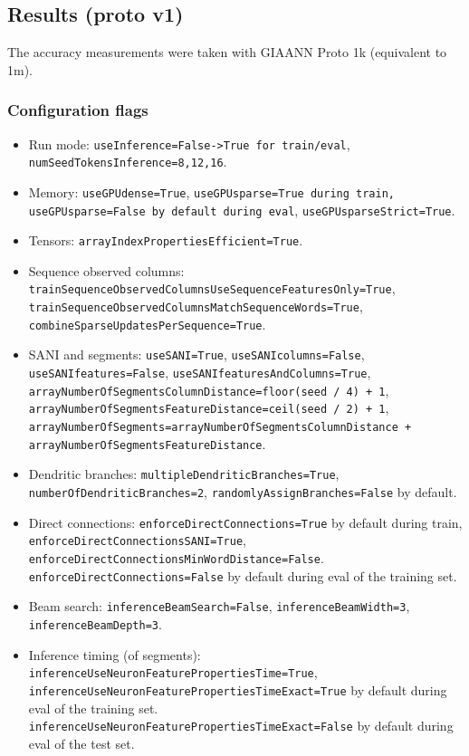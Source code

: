 

\subsection{Results (proto v1)}

The accuracy measurements were taken with GIAANN Proto 1k (equivalent to 1m).

\subsubsection{Configuration flags}

\begin{itemize}
	\item Run mode: \texttt{useInference=False->True for train/eval}, \texttt{numSeedTokensInference=8,12,16}.
	\item Memory: \texttt{useGPUdense=True}, \texttt{useGPUsparse=True during train, useGPUsparse=False by default during eval}, \texttt{useGPUsparseStrict=True}.
	\item Tensors: \texttt{arrayIndexPropertiesEfficient=True}.
	\item Sequence observed columns: \texttt{trainSequenceObservedColumnsUseSequenceFeaturesOnly=True}, \texttt{trainSequenceObservedColumnsMatchSequenceWords=True}, \texttt{combineSparseUpdatesPerSequence=True}.
	\item SANI and segments: \texttt{useSANI=True}, \texttt{useSANIcolumns=False}, \texttt{useSANIfeatures=False}, \texttt{useSANIfeaturesAndColumns=True}, \texttt{arrayNumberOfSegmentsColumnDistance=floor(seed / 4) + 1}, \texttt{arrayNumberOfSegmentsFeatureDistance=ceil(seed / 2) + 1}, \texttt{arrayNumberOfSegments=arrayNumberOfSegmentsColumnDistance + arrayNumberOfSegmentsFeatureDistance}.
	\item Dendritic branches: \texttt{multipleDendriticBranches=True}, \texttt{numberOfDendriticBranches=2}, \texttt{randomlyAssignBranches=False} by default.
	\item Direct connections: \texttt{enforceDirectConnections=True} by default during train, \texttt{enforceDirectConnectionsSANI=True}, \texttt{enforceDirectConnectionsMinWordDistance=False}. \texttt{enforceDirectConnections=False} by default during eval of the training set.
	\item Beam search: \texttt{inferenceBeamSearch=False}, \texttt{inferenceBeamWidth=3}, \texttt {inferenceBeamDepth=3}.
	\item Inference timing (of segments): \texttt{inferenceUseNeuronFeaturePropertiesTime=True}, \texttt{inferenceUseNeuronFeaturePropertiesTimeExact=True} by default during eval of the training set. \texttt{inferenceUseNeuronFeaturePropertiesTimeExact=False} by default during eval of the test set.

\end{itemize}
